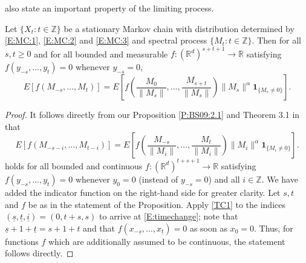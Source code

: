 \documentclass{aptpubarxiv}
\numberwithin{equation}{section}
\begin{document}
\citet{BS09} also state an important property of the limiting process.
\begin{prop}
\label{P:BS09:3.1} 
Let $\{ X_t : t \in {\mathbb{Z}}\}$ be a stationary Markov chain with distribution determined by \eqref{E:MC:1}, \eqref{E:MC:2} and \eqref{E:MC:3} and spectral process $\{M_t: t \in \mathbb{Z}\}$. Then for all $s,t \geq 0$ and for all bounded and measurable $f:(\mathbb{R}^d)^{s+t+1} \to \mathbb{R}$ satisfying $f(y_{-s}, \ldots, y_t)=0$ whenever $y_{-s}=0$,
\begin{equation}
\label{E:timechange}
 E\left[f(M_{-s}, \ldots, M_{t}) \right]= E\left[f\left(\frac{M_0}{\|M_s\|}, \ldots, \frac{M_{s+t}}{\|M_s\|} \right) \|M_s\|^\alpha{\boldsymbol{1}}_{\{M_s \neq 0\}} \right].
\end{equation}
\end{prop}
\begin{proof}
It follows directly from our Proposition \ref{P:BS09:2.1} and Theorem 3.1 in \cite{BS09} that 
\begin{equation}\label{TC1}
 E\left[f(M_{-s-i}, \ldots, M_{t-i}) \right]= E\left[f\left(\frac{M_{-s}}{\|M_i\|}, \ldots, \frac{M_{t}}{\|M_i\|} \right) \|M_i\|^\alpha{\boldsymbol{1}}_{\{M_i \neq 0\}} \right].
\end{equation}
holds for all bounded and continuous $f:(\mathbb{R}^d)^{t+s+1} \to \mathbb{R}$ satisfying $f(y_{-s}, \ldots, y_t)=0$ whenever $y_0=0$ (instead of $y_{-s}=0$) and all $i \in \mathbb{Z}$. We have added the indicator function on the right-hand side for greater clarity. Let $s, t$ and $f$ be as in the statement of the Proposition. Apply \eqref{TC1} to the indices $(\underline{s}, \underline{t}, \underline{i}) = (0, t+s, s)$ to arrive at \eqref{E:timechange}; note that $\underline{s} + 1 + \underline{t} = s + 1 + t$ and that $f(x_{-\underline{s}}, \ldots, x_{\underline{t}}) = 0$ as soon as $x_0 = 0$. Thus, for functions $f$ which are additionally assumed to be continuous, the statement follows directly. 


\end{proof}
\end{document}
